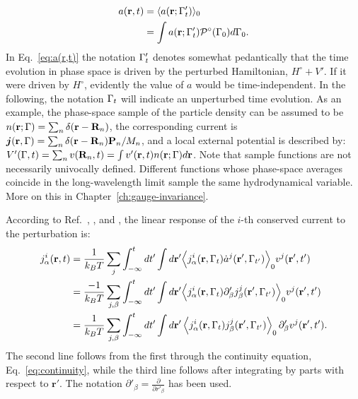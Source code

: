\begin{equation}
  \begin{aligned}
    a(\mathbf{r},t) &= \langle a(\mathbf{r};\rGamma'_t)\rangle_0 \\
    &= \int a(\mathbf{r};\rGamma'_t) \mathcal{P}^\circ(\rGamma_0) d\rGamma_0.
  \end{aligned} \label{eq:a(r,t)}
\end{equation}
In Eq.~\eqref{eq:a(r,t)} the notation ${\mathrm\Gamma}'_t$ denotes somewhat pedantically that the time evolution in phase space is driven by the perturbed Hamiltonian, $H^\circ+V'$. If it were driven by $H^\circ$, evidently the value of $a$ would be time-independent. In the following, the notation ${\mathrm\Gamma}_t$ will indicate an unperturbed time evolution. As an example, the phase-space sample of the particle density can be assumed to be $n(\mathbf{r};{\mathrm\Gamma}) = \sum_n \delta (\mathbf{r}-\mathbf{R}_n)$, the corresponding current is $\bm{j} (\mathbf{r}, {\mathrm\Gamma}) = \sum_n \delta(\mathbf{r}-\mathbf{R}_n) \mathbf{P}_n / M_n $, and a local external potential is described by: $V'({\mathrm\Gamma},t)=\sum_n v(\mathbf{R}_n,t)=\int v'(\mathbf{r},t) n(\mathbf{r};{\mathrm\Gamma}) d \mathbf{r}$. Note that sample functions are not necessarily univocally defined. Different functions whose phase-space averages coincide in the long-wavelength limit sample the same hydrodynamical variable. More on this in Chapter~\ref{ch:gauge-invariance}.

According to Ref.~, , and , the linear response of the $i$-th conserved current to the perturbation is:
\begin{align}
  j_\alpha^i(\mathbf{r},t) & = \frac{1}{k_B T} \sum_j \int_{-\infty}^t dt' \int d\mathbf{r}' \Bigl \langle j_\alpha^i(\mathbf{r},\rGamma_t)\dot a^j(\mathbf{r}',\rGamma_{t'})\Bigr \rangle_0 v^j(\mathbf{r}',t') \\
  &= \frac{-1}{k_B T} \sum_{j,\beta} \int_{-\infty}^t dt' \int d\mathbf{r}' \Bigl \langle j_\alpha^i(\mathbf{r},\rGamma_t) \partial'_\beta j_\beta^j(\mathbf{r}',\rGamma_{t'})\Bigr \rangle_0 v^j(\mathbf{r}',t') \\
  &= \frac{1}{k_B T} \sum_{j,\beta} \int_{-\infty}^t dt' \int d\mathbf{r}' \left \langle j_\alpha^i(\mathbf{r},\rGamma_{t}) j_\beta^j(\mathbf{r}',\rGamma_{t'})\right \rangle_0 \partial'_\beta v^j(\mathbf{r}',t'). \label{eq:linear-response-c}
\end{align}
The second line follows from the first through the continuity equation, Eq.~\eqref{eq:continuity}, while the third line follows after integrating by parts with respect to $\mathbf{r}'$. The notation $\partial'_\beta=\frac{\partial}{\partial r'_\beta}$ has been used.


